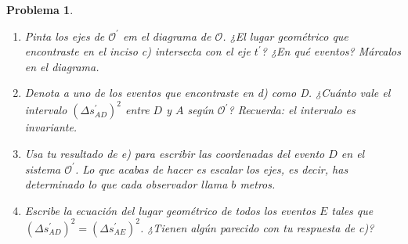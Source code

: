 \documentclass[12pt]{article}
\theoremstyle{break}
\newtheorem{exercise}{Problema}
\theoremstyle{nonumberbreak}
\newcommand*{\observer}{\mathcal{O}}
\newcommand*{\primeobserver}{\mathcal{O}^{\prime}}
\begin{document}
\begin{exercise}
\begin{enumerate}[label = \alph*)]
            \item Pinta los ejes de \(\primeobserver\) em el diagrama de \(\observer\). ¿El lugar geométrico que encontraste en el inciso c) intersecta con el eje \(t^{\prime}\)? ¿En qué eventos? Márcalos en el diagrama.
            \item Denota a uno de los eventos que encontraste en d) como D. ¿Cuánto vale el intervalo \((\Delta s^{\prime}_{AD})^{2}\) entre \(D\) y \(A\) según \(\primeobserver\)? Recuerda: el intervalo es invariante.
            \item Usa tu resultado de e) para escribir las coordenadas del evento \(D\) en el sistema \(\primeobserver\). Lo que acabas de hacer es escalar los ejes, es decir, has determinado lo que cada observador llama \(b\) metros.
            \item Escribe la ecuación del lugar geométrico de todos los eventos \(E\) tales que \((\Delta s^{\prime}_{AD})^{2} = (\Delta s^{\prime}_{AE})^{2}\). ¿Tienen algún parecido con tu respuesta de c)?
        \end{enumerate}
    \end{exercise}
\end{document}
